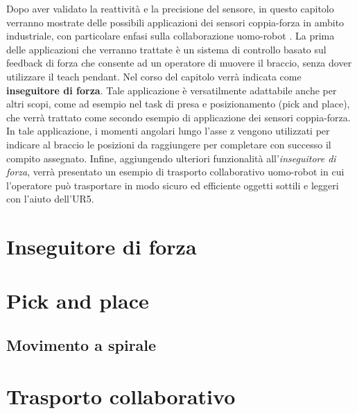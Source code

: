 Dopo aver validato la reattivit\`{a} e la precisione del sensore, in questo capitolo verranno mostrate delle possibili applicazioni 
dei sensori coppia-forza in ambito industriale, con particolare enfasi sulla collaborazione uomo-robot \cite{applications}. 
La prima delle applicazioni che verranno trattate \`{e} un sistema di controllo basato sul feedback di forza che consente ad un 
operatore di muovere il braccio, senza dover utilizzare 
il teach pendant. Nel corso del capitolo verr\`{a} indicata come \textbf{inseguitore di forza}. Tale applicazione \`{e} versatilmente 
adattabile anche per altri scopi, come ad esempio nel task di presa e posizionamento (pick and place), che verr\`{a} trattato come 
secondo esempio di applicazione dei sensori coppia-forza. In tale applicazione, i momenti angolari lungo l'asse z vengono 
utilizzati per indicare al braccio le posizioni da raggiungere per completare con successo il compito assegnato. 
Infine, aggiungendo ulteriori funzionalit\`{a} all'\textit{inseguitore di forza}, verr\`{a} presentato un esempio di trasporto 
collaborativo uomo-robot in cui l'operatore pu\`{o} trasportare in modo sicuro ed efficiente oggetti sottili e leggeri con l'aiuto 
dell'UR5.

\section{Inseguitore di forza} \label{sec:force_follower}


\section{Pick and place} \label{sec:pick_place}


\subsection{Movimento a spirale}


\section{Trasporto collaborativo}
